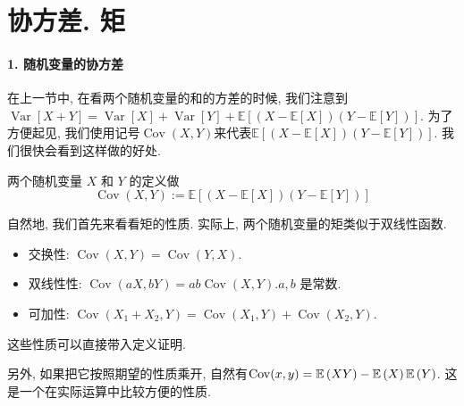 \section{协方差. 矩}

\paragraph{1. 随机变量的协方差}在上一节中, 在看两个随机变量的和的方差的时候, 我们注意到$\operatorname{Var}[X+Y]=\operatorname{Var}[X]+\operatorname{Var}[Y]+\mathbb{E}[(X-\mathbb{E}[X])(Y-\mathbb{E}[Y])]$. 为了方便起见, 我们使用记号$\operatorname{Cov}(X, Y)$来代表$\mathbb{E}[(X-\mathbb{E}[X])(Y-\mathbb{E}[Y])]$. 我们很快会看到这样做的好处. 

\begin{definition}
    两个随机变量 $X$ 和 $Y$ 的定义做
$$
\operatorname{Cov}(X, Y):=\mathbb{E}[(X-\mathbb{E}[X])(Y-\mathbb{E}[Y])]
$$
\end{definition}

自然地, 我们首先来看看矩的性质. 实际上, 两个随机变量的矩类似于双线性函数. 

\begin{itemize}
    \item 交换性: $\operatorname{Cov}(X, Y)=\operatorname{Cov}(Y, X)$.
    \item 双线性性: $\operatorname{Cov}(a X, b Y)=a b \operatorname{Cov}(X, Y). a, b$ 是常数.
    \item 可加性: $\operatorname{Cov}\left(X_1+X_2, Y\right)=\operatorname{Cov}\left(X_1, Y\right)+\operatorname{Cov}\left(X_2, Y\right)$.
\end{itemize}

这些性质可以直接带入定义证明. 

另外, 如果把它按照期望的性质乘开, 自然有$\operatorname{Cov}(x,y)=\mathbb E\left(XY\right)-\mathbb E\left(X\right)\mathbb E\left(Y\right)$. 这是一个在实际运算中比较方便的性质. 

